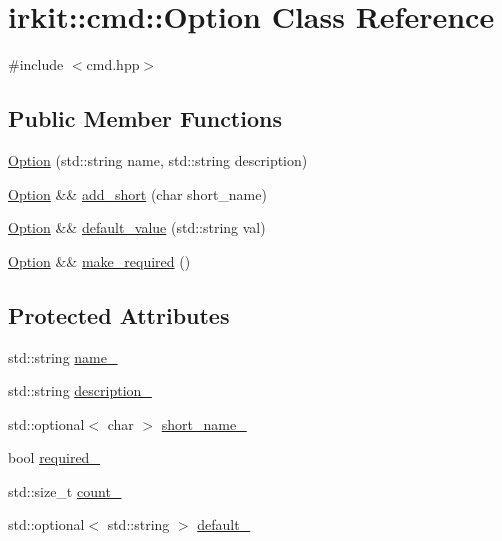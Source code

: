 \hypertarget{classirkit_1_1cmd_1_1Option}{}\section{irkit\+:\+:cmd\+:\+:Option Class Reference}
\label{classirkit_1_1cmd_1_1Option}


{\ttfamily \#include $<$cmd.\+hpp$>$}

\subsection*{Public Member Functions}
\begin{DoxyCompactItemize}
\item 
\mbox{\hyperlink{classirkit_1_1cmd_1_1Option_a3a0e2504511cf3b0d90005fae4389bb7}{Option}} (std\+::string name, std\+::string description)
\item 
\mbox{\hyperlink{classirkit_1_1cmd_1_1Option}{Option}} \&\& \mbox{\hyperlink{classirkit_1_1cmd_1_1Option_ab36042739a1cc45ebc85cd64ee69b560}{add\+\_\+short}} (char short\+\_\+name)
\item 
\mbox{\hyperlink{classirkit_1_1cmd_1_1Option}{Option}} \&\& \mbox{\hyperlink{classirkit_1_1cmd_1_1Option_a6fe2de0ed5652eea80f0f1fc673ffac5}{default\+\_\+value}} (std\+::string val)
\item 
\mbox{\hyperlink{classirkit_1_1cmd_1_1Option}{Option}} \&\& \mbox{\hyperlink{classirkit_1_1cmd_1_1Option_a04afc2dfced8739602608773fc99cac2}{make\+\_\+required}} ()
\end{DoxyCompactItemize}
\subsection*{Protected Attributes}
\begin{DoxyCompactItemize}
\item 
std\+::string \mbox{\hyperlink{classirkit_1_1cmd_1_1Option_ad25124efa7ae75d27c31ac53858bdd1d}{name\+\_\+}}
\item 
std\+::string \mbox{\hyperlink{classirkit_1_1cmd_1_1Option_ab98a1584c51d9f4b694690733d64be39}{description\+\_\+}}
\item 
std\+::optional$<$ char $>$ \mbox{\hyperlink{classirkit_1_1cmd_1_1Option_a16438ebc30b37f78e745b1c314454ac4}{short\+\_\+name\+\_\+}}
\item 
bool \mbox{\hyperlink{classirkit_1_1cmd_1_1Option_adf6ed5c1644eece18c1627a31faba901}{required\+\_\+}}
\item 
std\+::size\+\_\+t \mbox{\hyperlink{classirkit_1_1cmd_1_1Option_a946fa23a0f86581ba041652c61b112b9}{count\+\_\+}}
\item 
std\+::optional$<$ std\+::string $>$ \mbox{\hyperlink{classirkit_1_1cmd_1_1Option_add744f5544f72955ed7fa7a80891003a}{default\+\_\+}}
\end{DoxyCompactItemize}
